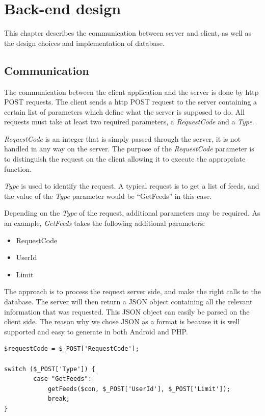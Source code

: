 \chapter{Back-end design}
This chapter describes the communication between server and client, as well as the design choices and implementation of database.

\section{Communication}
\label{sec:com}

The communication between the client application and the server is done by \ac{http} POST requests.
The client sends a \ac{http} POST request to the server containing a certain list of parameters which define what the server is supposed to do. All requests must take at least two required parameters, a \textit{RequestCode} and a \textit{Type}.

\textit{RequestCode} is an integer that is simply passed through the server, it is not handled in any way on the server. The purpose of the \textit{RequestCode} parameter is to distinguish the request on the client allowing it to execute the appropriate function.

\textit{Type} is used to identify the request. A typical request is to get a list of feeds, and the value of the \textit{Type} parameter would be ``GetFeeds'' in this case.

Depending on the \textit{Type} of the request, additional parameters may be required. As an example, \textit{GetFeeds} takes the following additional parameters:
\begin{itemize}
\item RequestCode
\item UserId
\item Limit
\end{itemize}

The approach is to process the request server side, and make the right calls to the database. The server will then return a JSON object containing all the relevant information that was requested. This JSON object can easily be parsed on the client side. The reason why we chose JSON as a format is because it is well supported and easy to generate in both Android and PHP.

\begin{lstlisting}[language=phpstyle, caption=getFeeds function call]
$requestCode = $_POST['RequestCode'];

switch ($_POST['Type']) {
        case "GetFeeds":
            getFeeds($con, $_POST['UserId'], $_POST['Limit']);
            break;
}
\end{lstlisting}

